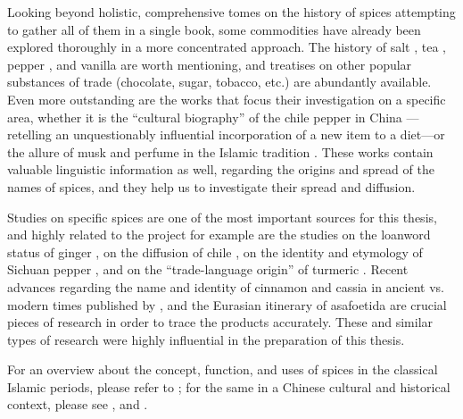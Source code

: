 Looking beyond holistic, comprehensive tomes on the history of spices attempting to gather all of them in a single book, some commodities have already been explored thoroughly in a more concentrated approach. The history of salt \autocite{kurlansky_salt_2002}, tea \autocite{mair_true_2009}, pepper \autocite{shaffer_pepper_2013}, and vanilla \autocite{rain_vanilla_2004} are worth mentioning, and treatises on other popular substances of trade (chocolate, sugar, tobacco, etc.) are abundantly available. Even more outstanding are the works that focus their investigation on a specific area, whether it is the ``cultural biography'' of the chile pepper in China \autocite{dott_chile_2020}---retelling an unquestionably influential incorporation of a new item to a diet---or the allure of musk and perfume in the Islamic tradition \autocite{king_musk_2007}. These works contain valuable linguistic information as well, regarding the origins and spread of the names of spices, and they help us to investigate their spread and diffusion. 

Studies on specific spices are one of the most important sources for this thesis, and highly related to the project for example are the studies on the loanword status of ginger \autocite{ross_ginger_1952}, on the diffusion of chile \autocite{wright_medieval_2007}, on the identity and etymology of Sichuan pepper \autocite{austin_sichuan_2008}, and on the ``trade-language origin'' of turmeric \autocite{guthrie_trade-language_2009}. Recent advances regarding the name and identity of cinnamon and cassia in ancient vs. modern times published by \textcite{haw_cinnamon_2017}, and the Eurasian itinerary of asafoetida \autocite{leung_itinerary_2019} are crucial pieces of research in order to trace the products accurately. These and similar types of research were highly influential in the preparation of this thesis.

For an overview about the concept, function, and uses of spices in the classical Islamic periods, please refer to \textcite{dietrich_afawih_2004}; for the same in a Chinese cultural and historical context, please see \textcite[147-153]{hu_food_2005}, and \textcite{yan__2006}.





